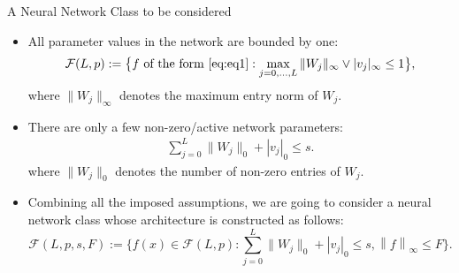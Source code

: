 \documentclass{if-beamer}
\begin{document}
\begin{frame}{A Neural Network Class to be considered}
    \begin{itemize}
        \item All parameter values in the network are bounded by one:
        \begin{eqnarray*}
            \mathcal{F}(L,p):=\big\{ f \mbox{ of the form } \eqref{eq:eq1} : \max_{j=0,\dots,L}\|W_j\|_{\infty} \vee |v_j|_{\infty} \leq 1 \big\},
        \end{eqnarray*}
        where $\|W_j\|_{\infty}$ denotes the maximum entry norm of $W_j$.
        
        \item There are only a few non-zero/active network parameters: 
        \begin{eqnarray*}
            \sum^{L}_{j=0}\|W_j\|_{0} + |v_j|_{0} \leq s.
        \end{eqnarray*}
        where $\|W_j\|_{0}$ denotes the number of non-zero entries of $W_j$.

        \item Combining all the imposed assumptions, we are going to consider a neural network class whose architecture is constructed as follows: 
        \begin{equation*}
            \mathcal{F}(L,p,s,F)
            :=\bigg\{ f(x) \in \mathcal{F}(L,p) : \sum^{L}_{j=0}\|W_j\|_{0}+
            |v_j|_{0} \leq s, \left\| f \right\|_{\infty} \leq F \bigg\}.
        \end{equation*}
    \end{itemize}
\end{frame}
\end{document}
